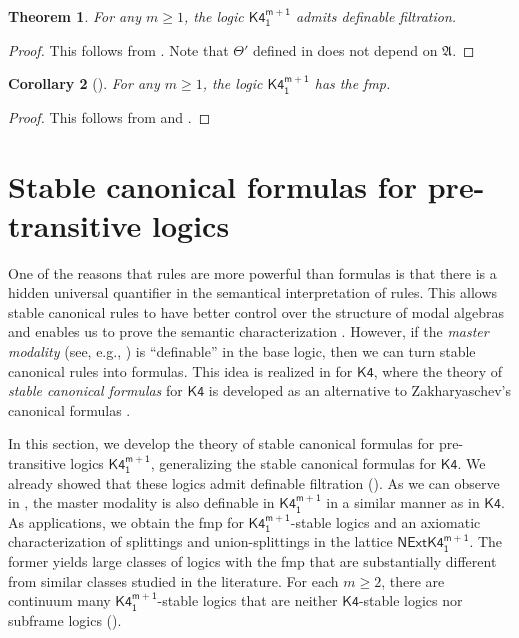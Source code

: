 \documentclass[a4paper,11pt]{article}
\newtheorem{theorem}{Theorem}
\newtheorem{corollary}[theorem]{Corollary}
\theoremstyle{definition}
\theoremstyle{remark}
\numberwithin{theorem}{section}
\newcommand{\alg}[1]{\mathfrak{#1}}
\newcommand{\A}{\alg{A}}
\newcommand{\logic}[1]{\mathsf{#1}}
\newcommand{\Kf}{\logic{K4}}
\newcommand{\Kff}[2]{\logic{K4^{#1}_{#2}}}
\newcommand{\NExt}[1]{\mathsf{NExt}{#1}}
\begin{document}
\begin{theorem} \label{3: Thm K4m1 admits filtration}
    For any $m \geq 1$, the logic $\Kff{m+1}{1}$ admits definable filtration. 
\end{theorem}

\begin{proof}
    This follows from . Note that $\Theta'$ defined in  does not depend on $\A$.
\end{proof}

\begin{corollary}[\cite{ageneralfiltrationmethod1972}] \label{3: Cor K4m1 fmp}
    For any $m \geq 1$, the logic $\Kff{m+1}{1}$ has the fmp.
\end{corollary}

\begin{proof}
    This follows from  and .
\end{proof}


\section{Stable canonical formulas for pre-transitive logics} \label{Sec 5}



One of the reasons that rules are more powerful than formulas is that there is a hidden universal quantifier in the semantical interpretation of rules. This allows stable canonical rules to have better control over the structure of modal algebras and enables us to prove the semantic characterization . However, if the \emph{master modality} (see, e.g., \cite[Section 6.5]{blackburnModalLogic2001}) is ``definable'' in the base logic, then we can turn stable canonical rules into formulas. This idea is realized in \cite[Section 6]{stablecanonicalrules} for $\Kf$, where the theory of \emph{stable canonical formulas} for $\Kf$ is developed as an alternative to Zakharyaschev's canonical formulas \cite{zakharyaschevCanonicalFormulas1}.

In this section, we develop the theory of stable canonical formulas for pre-transitive logics $\Kff{m+1}{1}$, generalizing the stable canonical formulas for $\Kf$. We already showed that these logics admit definable filtration (). As we can observe in , the master modality is also definable in $\Kff{m+1}{1}$ in a similar manner as in $\Kf$. As applications, we obtain the fmp for $\Kff{m+1}{1}$-stable logics and an axiomatic characterization of splittings and union-splittings in the lattice $\NExt{\Kff{m+1}{1}}$. The former yields large classes of logics with the fmp that are substantially different from similar classes studied in the literature. For each $m \geq 2$, there are continuum many $\Kff{m+1}{1}$-stable logics that are neither $\Kf$-stable logics nor subframe logics ().
\end{document}
